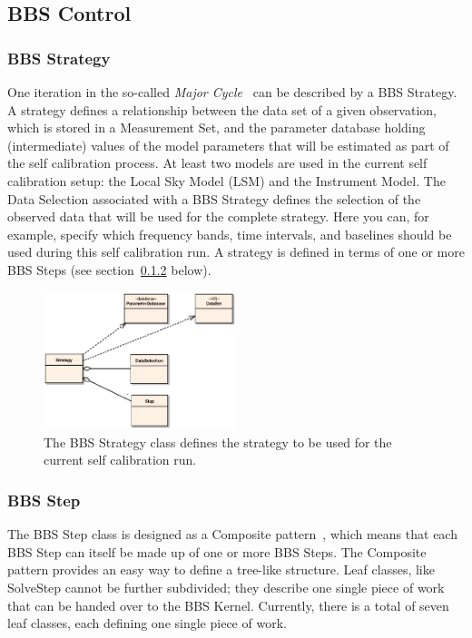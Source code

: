\documentclass[10pt]{lofar}
\begin{document}
\subsection{BBS Control}
\label{subsec:design-control}

\subsubsection{BBS Strategy}
\label{subsubsec:design-strategy}
One iteration in the so-called \emph{Major 
Cycle}~\cite[sec.~4.1]{LOFAR-ASTRON-SDD-050} can be described by a BBS
Strategy. A strategy defines a relationship between the data set of a given
observation, which is stored in a Measurement Set, and the parameter database
holding (intermediate) values of the model parameters that will be estimated
as part of the self calibration process. At least two models are used in the
current self calibration setup: the Local Sky Model (LSM) and the Instrument
Model. The Data Selection associated with a BBS Strategy defines the selection
of the observed data that will be used for the complete strategy. Here you
can, for example, specify which frequency bands, time intervals, and baselines
should be used during this self calibration run. A strategy is defined in
terms of one or more BBS Steps (see section~\ref{subsubsec:design-step}
below).

\begin{figure}[!ht]
\centering
\includegraphics[width=0.5\textwidth]{images/bbs-strategy-class-diagram}
\caption{The BBS Strategy class defines the strategy to be used for the
current self calibration run.}
\label{fig:bbsstrategy}
\end{figure}

\subsubsection{BBS Step}
\label{subsubsec:design-step}
The BBS Step class is designed as a Composite pattern~\cite{Gamma1995}, which means that
each BBS Step can itself be made up of one or more BBS Steps. The Composite
pattern provides an easy way to define a tree-like structure. Leaf classes,
like SolveStep cannot be further subdivided; they describe one single
piece of work that can be handed over to the BBS Kernel. Currently, there is a
total of seven leaf classes, each defining one single piece of work.
\end{document}
